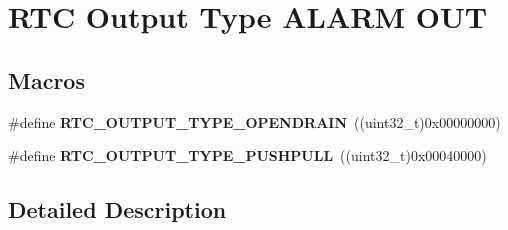 \hypertarget{group___r_t_c___output___type___a_l_a_r_m___o_u_t}{}\section{R\+TC Output Type A\+L\+A\+RM O\+UT}
\label{group___r_t_c___output___type___a_l_a_r_m___o_u_t}
\subsection*{Macros}
\begin{DoxyCompactItemize}
\item 
\#define {\bfseries R\+T\+C\+\_\+\+O\+U\+T\+P\+U\+T\+\_\+\+T\+Y\+P\+E\+\_\+\+O\+P\+E\+N\+D\+R\+A\+IN}~((uint32\+\_\+t)0x00000000)\hypertarget{group___r_t_c___output___type___a_l_a_r_m___o_u_t_gaa2505e0038154990024b533160bd46bd}{}\label{group___r_t_c___output___type___a_l_a_r_m___o_u_t_gaa2505e0038154990024b533160bd46bd}

\item 
\#define {\bfseries R\+T\+C\+\_\+\+O\+U\+T\+P\+U\+T\+\_\+\+T\+Y\+P\+E\+\_\+\+P\+U\+S\+H\+P\+U\+LL}~((uint32\+\_\+t)0x00040000)\hypertarget{group___r_t_c___output___type___a_l_a_r_m___o_u_t_ga3e0b4512d6531cb0bb428163d7bd927d}{}\label{group___r_t_c___output___type___a_l_a_r_m___o_u_t_ga3e0b4512d6531cb0bb428163d7bd927d}

\end{DoxyCompactItemize}


\subsection{Detailed Description}
